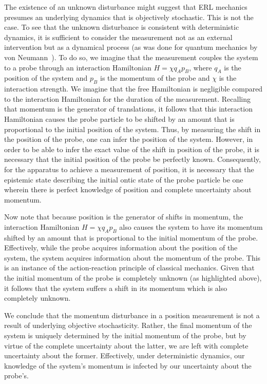 \documentclass[pra,superscriptaddress,nofootinbib,12pt]{revtex4-2}
\begin{document}
The existence of an unknown disturbance might suggest that ERL mechanics presumes an underlying dynamics that is objectively stochastic.  This is not the case.
To see that the unknown disturbance is consistent with deterministic dynamics, it is sufficient to consider the measurement not as an external intervention but as a dynamical process (as was done for quantum mechanics by von Neumann~\cite{JvNtext}).  To do so, we imagine that the measurement couples the system to a probe through an interaction Hamiltonian $H= \chi q_A p_B$, where $q_A$ is the position of the system and $p_B$ is the momentum of the probe and $\chi$ is the interaction strength.  We imagine that the free Hamiltonian is negligible compared to the interaction Hamiltonian for the duration of the measurement. Recalling that momentum is the generator of translations, it follows that this interaction Hamiltonian causes the probe particle to be shifted by an amount that is proportional to the initial position of the system.  Thus, by measuring the shift in the position of the probe, one can infer the position of the system.  However, in order to be able to infer the exact value of the shift in position of the probe, it is necessary that the initial position of the probe be perfectly known.  Consequently, for the apparatus to achieve a measurement of position, it is necessary that the epistemic state describing the initial ontic state of the probe particle be one wherein there is perfect knowledge of position and complete uncertainty about momentum.

Now note that because position is the generator of shifts in momentum, the interaction Hamiltonian $H= \chi q_A p_B$ also causes the system to have its momentum shifted by an amount that is proportional to the initial momentum of the probe.  Effectively, while the probe acquires information about the position of the system, the system acquires information about the momentum of the probe.  This is an instance of the action-reaction principle of classical mechanics.  Given that the initial momentum of the probe is completely unknown (as highlighted above), it follows that the system suffers a shift in its momentum which is also completely unknown.

We conclude that the momentum disturbance in a position measurement is not a result of underlying objective stochasticity.  Rather, the final momentum of the system is uniquely determined by the initial momentum of the probe, but by virtue of the complete uncertainty about the latter, we are left with complete uncertainty about the former.  Effectively, under deterministic dynamics, our knowledge of the system's momentum is infected by our uncertainty about the probe's.
\end{document}
